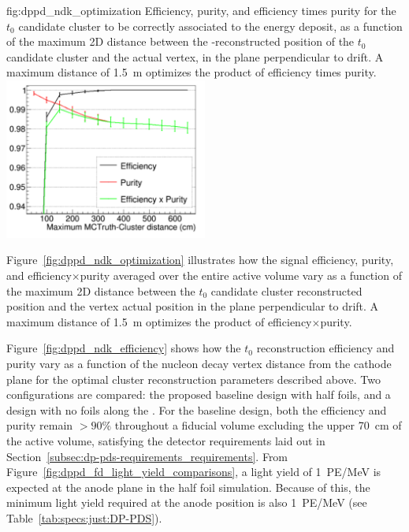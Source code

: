 \begin{dunefigure}{fig:dppd_ndk_optimization}
{Efficiency, purity, and efficiency times purity for the $t_0$ candidate cluster to be correctly associated to the  energy deposit, as a function of the maximum 2D distance between the -reconstructed position of the $t_0$ candidate cluster and the actual  vertex, in the plane perpendicular to drift. A maximum distance of \SI{1.5}{\m} optimizes the product of efficiency times purity.}
\includegraphics[width=0.5\textwidth]{graphics/dppd_ndk_optimization.pdf}
\end{dunefigure}

Figure~\ref{fig:dppd_ndk_optimization} illustrates how the  signal efficiency, purity, and efficiency$\times$purity averaged over the entire  active volume vary as a function of the maximum 2D distance between the $t_0$ candidate cluster reconstructed position and the  vertex actual position in the plane perpendicular to drift. A maximum distance of \SI{1.5}{\m} optimizes the product of efficiency$\times$purity. 

Figure~\ref{fig:dppd_ndk_efficiency} shows how the  $t_0$ reconstruction efficiency and purity vary as a function of the nucleon decay vertex distance from the cathode plane for the optimal cluster reconstruction parameters described above. Two configurations are compared: the proposed baseline design with half foils, and a design with no foils along the . For the baseline design, both the efficiency and purity remain $>90\%$ throughout a  fiducial volume excluding the upper \SI{70}{cm} of the  active volume, satisfying the detector requirements laid out in Section~\ref{subsec:dp-pds-requirements_requirements}. From Figure~\ref{fig:dppd_fd_light_yield_comparisons}, a light yield of \SI{1}{PE/\MeV} is expected at the anode plane in the half foil simulation. Because of this, the  minimum light yield required at the anode position is also \SI{1}{PE/\MeV} (see Table~\ref{tab:specs:just:DP-PDS}). 

